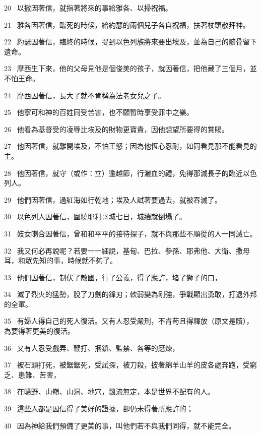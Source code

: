 \par
20 
以撒因著信，就指著將來的事給雅各、以掃祝福。
\par
21 
雅各因著信，臨死的時候，給約瑟的兩個兒子各自祝福，扶著杖頭敬拜神。
\par
22 
約瑟因著信，臨終的時候，提到以色列族將來要出埃及，並為自己的骸骨留下遺命。
\par
23 
摩西生下來，他的父母見他是個俊美的孩子，就因著信，把他藏了三個月，並不怕王命。
\par
24 
摩西因著信，長大了就不肯稱為法老女兒之子。
\par
25 
他寧可和神的百姓同受苦害，也不願暫時享受罪中之樂。
\par
26 
他看為基督受的凌辱比埃及的財物更寶貴，因他想望所要得的賞賜。
\par
27 
他因著信，就離開埃及，不怕王怒；因為他恆心忍耐，如同看見那不能看見的主。
\par
28 
他因著信，就守（或作：立）逾越節，行灑血的禮，免得那滅長子的臨近以色列人。
\par
29 
他們因著信，過紅海如行乾地；埃及人試著要過去，就被吞滅了。
\par
30 
以色列人因著信，圍繞耶利哥城七日，城牆就倒塌了。
\par
31 
妓女喇合因著信，曾和和平平的接待探子，就不與那些不順從的人一同滅亡。
\par
32 
我又何必再說呢？若要一一細說，基甸、巴拉、參孫、耶弗他、大衛、撒母耳，和眾先知的事，時候就不夠了。
\par
33 
他們因著信，制伏了敵國，行了公義，得了應許，堵了獅子的口，
\par
34 
滅了烈火的猛勢，脫了刀劍的鋒刃；軟弱變為剛強，爭戰顯出勇敢，打退外邦的全軍。
\par
35 
有婦人得自己的死人復活。又有人忍受嚴刑，不肯苟且得釋放（原文是贖），為要得著更美的復活。
\par
36 
又有人忍受戲弄、鞭打、捆鎖、監禁、各等的磨煉，
\par
37 
被石頭打死，被鋸鋸死，受試探，被刀殺，披著綿羊山羊的皮各處奔跑，受窮乏、患難、苦害，
\par
38 
在曠野、山嶺、山洞、地穴，飄流無定，本是世界不配有的人。
\par
39 
這些人都是因信得了美好的證據，卻仍未得著所應許的；
\par
40 
因為神給我們預備了更美的事，叫他們若不與我們同得，就不能完全。


\bye

